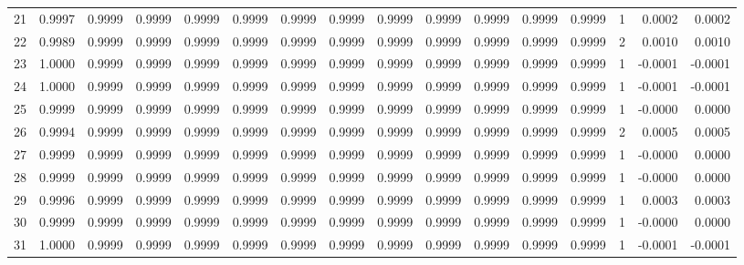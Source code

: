 \begin{tabular}{lrrrrrrrrrrrrrrr}
21  &      0.9997 &  0.9999 &  0.9999 &  0.9999 &  0.9999 &  0.9999 &  0.9999 &  0.9999 &  0.9999 &  0.9999 &   0.9999 &     0.9999 &      1 &                    0.0002 &                     0.0002 \\
22  &      0.9989 &  0.9999 &  0.9999 &  0.9999 &  0.9999 &  0.9999 &  0.9999 &  0.9999 &  0.9999 &  0.9999 &   0.9999 &     0.9999 &      2 &                    0.0010 &                     0.0010 \\
23  &      1.0000 &  0.9999 &  0.9999 &  0.9999 &  0.9999 &  0.9999 &  0.9999 &  0.9999 &  0.9999 &  0.9999 &   0.9999 &     0.9999 &      1 &                   -0.0001 &                    -0.0001 \\
24  &      1.0000 &  0.9999 &  0.9999 &  0.9999 &  0.9999 &  0.9999 &  0.9999 &  0.9999 &  0.9999 &  0.9999 &   0.9999 &     0.9999 &      1 &                   -0.0001 &                    -0.0001 \\
25  &      0.9999 &  0.9999 &  0.9999 &  0.9999 &  0.9999 &  0.9999 &  0.9999 &  0.9999 &  0.9999 &  0.9999 &   0.9999 &     0.9999 &      1 &                   -0.0000 &                     0.0000 \\
26  &      0.9994 &  0.9999 &  0.9999 &  0.9999 &  0.9999 &  0.9999 &  0.9999 &  0.9999 &  0.9999 &  0.9999 &   0.9999 &     0.9999 &      2 &                    0.0005 &                     0.0005 \\
27  &      0.9999 &  0.9999 &  0.9999 &  0.9999 &  0.9999 &  0.9999 &  0.9999 &  0.9999 &  0.9999 &  0.9999 &   0.9999 &     0.9999 &      1 &                   -0.0000 &                     0.0000 \\
28  &      0.9999 &  0.9999 &  0.9999 &  0.9999 &  0.9999 &  0.9999 &  0.9999 &  0.9999 &  0.9999 &  0.9999 &   0.9999 &     0.9999 &      1 &                   -0.0000 &                     0.0000 \\
29  &      0.9996 &  0.9999 &  0.9999 &  0.9999 &  0.9999 &  0.9999 &  0.9999 &  0.9999 &  0.9999 &  0.9999 &   0.9999 &     0.9999 &      1 &                    0.0003 &                     0.0003 \\
30  &      0.9999 &  0.9999 &  0.9999 &  0.9999 &  0.9999 &  0.9999 &  0.9999 &  0.9999 &  0.9999 &  0.9999 &   0.9999 &     0.9999 &      1 &                   -0.0000 &                     0.0000 \\
31  &      1.0000 &  0.9999 &  0.9999 &  0.9999 &  0.9999 &  0.9999 &  0.9999 &  0.9999 &  0.9999 &  0.9999 &   0.9999 &     0.9999 &      1 &                   -0.0001 &                    -0.0001 \\

\end{tabular}
